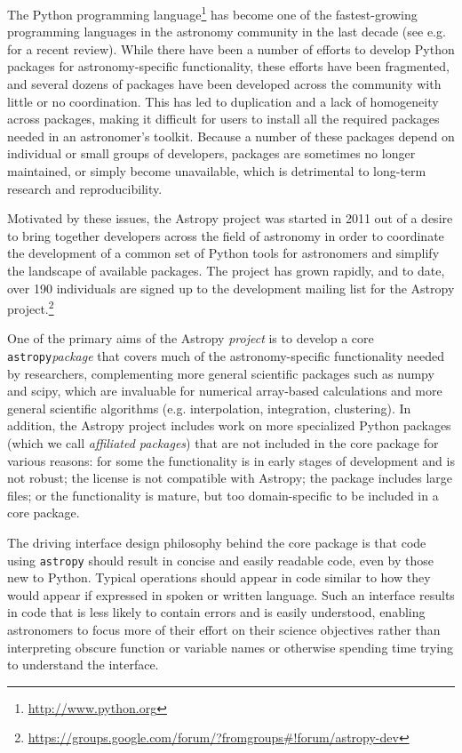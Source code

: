 \documentclass[traditabstract]{aa}
\newcommand{\astropy}{\texttt{astropy}\xspace}
\begin{document}
The Python programming language\footnote{\url{http://www.python.org}} has become
one of the fastest-growing programming languages in the astronomy community in
the last decade (see e.g. \citealt{greenfield11} for a recent review). While there have been a number of efforts to develop Python
packages for astronomy-specific functionality, these efforts have been
fragmented, and several dozens of packages have been developed across the
community with little or no coordination. This has led to duplication and a
lack of homogeneity across packages, making it difficult for users to install
all the required packages needed in an astronomer's toolkit. Because a number
of these packages depend on individual or small groups of developers, packages
are sometimes no longer maintained, or simply become unavailable, which is
detrimental to long-term research and reproducibility.

Motivated by these issues, the Astropy project was started in
2011 out of a desire to bring
together developers across the field of astronomy in order to coordinate the
development of a common set of Python tools for astronomers and
simplify the landscape of available packages. The project has grown rapidly,
and to date, over 190 individuals are signed up to the development mailing list for
the Astropy project.\footnote{
\url{https://groups.google.com/forum/?fromgroups#!forum/astropy-dev}}

One of the primary aims of the Astropy \textit{project} is to develop a core
\astropy \textit{package} that covers much of the astronomy-specific
functionality needed by researchers, complementing more general scientific
packages such as \gls{numpy} and \gls{scipy}, which are invaluable for
numerical array-based calculations and more general scientific algorithms (e.g.
interpolation, integration, clustering). In addition, the Astropy project
includes work on more specialized Python packages (which we call
\textit{affiliated packages}) that are not included in the core package for
various reasons: for some the functionality is in early stages of development
and is not robust; the license is not compatible with Astropy; the package
includes large files; or the functionality is mature, but too domain-specific
to be included in a core package.

The driving interface design philosophy behind the core package is that code
using \astropy should result in concise and easily readable code, even by those new to
Python. Typical operations should appear in code similar to how they would
appear if expressed in spoken or written language. Such an interface results in
code that is less likely to contain errors and is easily understood, enabling
astronomers to focus more of their effort on their science objectives rather
than interpreting obscure function or variable names or otherwise spending time
trying to understand the interface.
\end{document}
